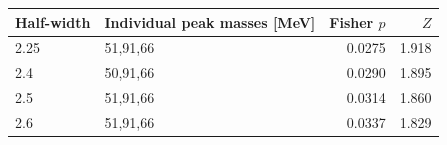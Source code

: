 \begin{center}\small\begin{tabular}{llrr}\toprule
Half-width & Individual peak masses [MeV] & Fisher $p$ & $Z$\\\midrule
2.25 & 51,91,66 & 0.0275 & 1.918\\
2.4 & 50,91,66 & 0.0290 & 1.895\\
2.5 & 51,91,66 & 0.0314 & 1.860\\
2.6 & 51,91,66 & 0.0337 & 1.829\\
\bottomrule\end{tabular}\end{center}
